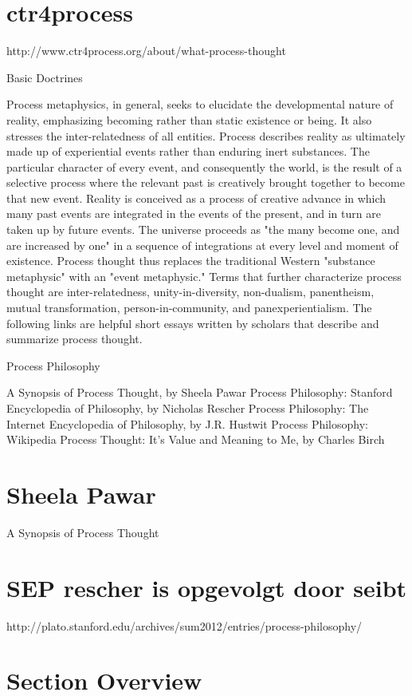 \documentclass[a4paper]{Thesis}
\begin{document}
\section{ctr4process}
http://www.ctr4process.org/about/what-process-thought

Basic Doctrines

Process metaphysics, in general, seeks to elucidate the developmental nature of reality, emphasizing becoming rather than static existence or being. It also stresses the inter-relatedness of all entities. Process describes reality as ultimately made up of experiential events rather than enduring inert substances. The particular character of every event, and consequently the world, is the result of a selective process where the relevant past is creatively brought together to become that new event. Reality is conceived as a process of creative advance in which many past events are integrated in the events of the present, and in turn are taken up by future events. The universe proceeds as "the many become one, and are increased by one" in a sequence of integrations at every level and moment of existence. Process thought thus replaces the traditional Western "substance metaphysic" with an "event metaphysic." Terms that further characterize process thought are inter-relatedness, unity-in-diversity, non-dualism, panentheism, mutual transformation, person-in-community, and panexperientialism. The following links are helpful short essays written by scholars that describe and summarize process thought.

Process Philosophy

A Synopsis of Process Thought, by Sheela Pawar
Process Philosophy: Stanford Encyclopedia of Philosophy, by Nicholas Rescher
Process Philosophy: The Internet Encyclopedia of Philosophy, by J.R. Hustwit
Process Philosophy: Wikipedia
Process Thought: It's Value and Meaning to Me, by Charles Birch


\section{Sheela Pawar}
A Synopsis of Process Thought


\section{SEP rescher is opgevolgt door seibt}
http://plato.stanford.edu/archives/sum2012/entries/process-philosophy/

\section{Section Overview}
\end{document}
